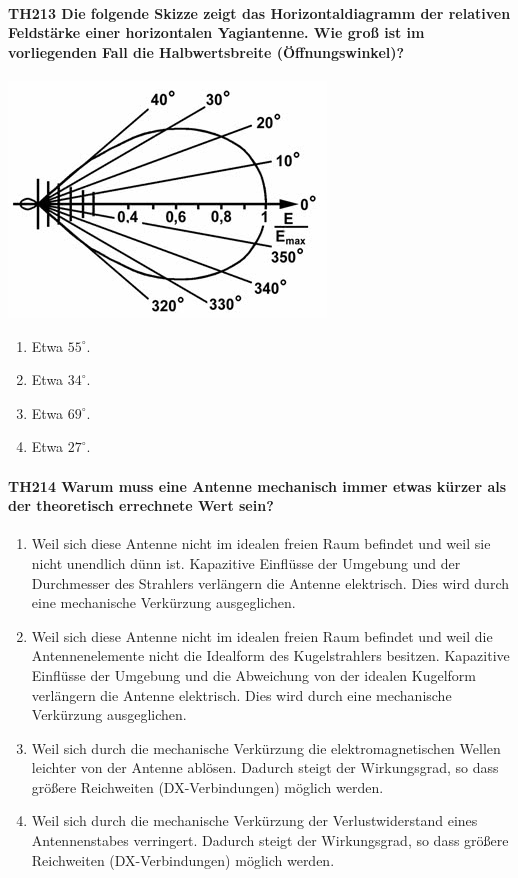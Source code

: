 \documentclass[8pt]{article}
\begin{document}
\paragraph*{TH213 Die folgende Skizze zeigt das Horizontaldiagramm der relativen Feldstärke einer horizontalen Yagiantenne. Wie groß ist im vorliegenden Fall die Halbwertsbreite (Öffnungswinkel)?}
\begin{center}
	\begin{minipage}{\linewidth}
		\centering
		\includegraphics[scale=1.0]{pics/th213_a.jpg}
	\end{minipage}
\end{center}
\begin{enumerate}[nolistsep,label=\Alph*]
\item Etwa $55^{\circ}$.
\item Etwa $34^{\circ}$.
\item Etwa $69^{\circ}$.
\item Etwa $27^{\circ}$.
\end{enumerate}

\paragraph*{TH214 Warum muss eine Antenne mechanisch immer etwas kürzer als der theoretisch errechnete Wert sein?}
\begin{enumerate}[nolistsep,label=\Alph*]
\item Weil sich diese Antenne nicht im idealen freien Raum befindet und weil sie nicht unendlich dünn ist. Kapazitive Einflüsse der Umgebung und der Durchmesser des Strahlers verlängern die Antenne elektrisch. Dies wird durch eine mechanische Verkürzung ausgeglichen.
\item Weil sich diese Antenne nicht im idealen freien Raum befindet und weil die Antennenelemente nicht die Idealform des Kugelstrahlers besitzen. Kapazitive Einflüsse der Umgebung und die Abweichung von der idealen Kugelform verlängern die Antenne elektrisch. Dies wird durch eine mechanische Verkürzung ausgeglichen.
\item Weil sich durch die mechanische Verkürzung die elektromagnetischen Wellen leichter von der Antenne ablösen. Dadurch steigt der Wirkungsgrad, so dass größere Reichweiten (DX-Verbindungen) möglich werden.
\item Weil sich durch die mechanische Verkürzung der Verlustwiderstand eines Antennenstabes verringert. Dadurch steigt der Wirkungsgrad, so dass größere Reichweiten (DX-Verbindungen) möglich werden.
\end{enumerate}
\end{document}
